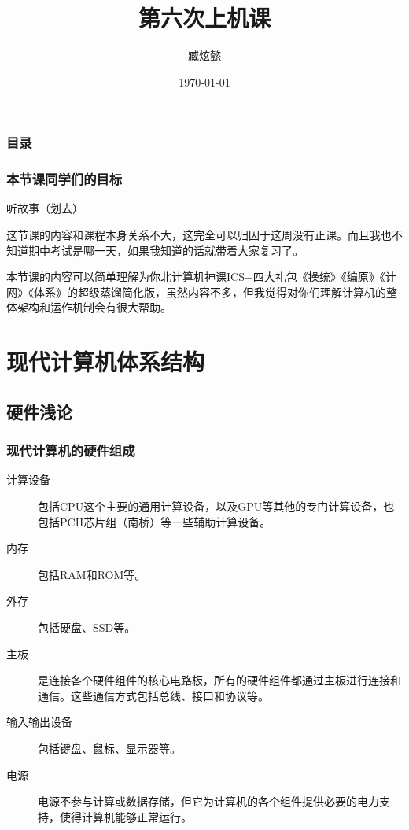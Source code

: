 \documentclass[fontset=none,aspectratio=1610]{ctexbeamer}
\title{第六次上机课}
\author{臧炫懿}
\date{\today}
\begin{document}
\frame{\titlepage}
\begin{frame}
    \frametitle{目录}
    \tableofcontents
\end{frame}

\begin{frame}
    \frametitle{本节课同学们的目标}

    听故事（划去）

    这节课的内容和课程本身关系不大，这完全可以归因于这周没有正课。而且我也不知道期中考试是哪一天，如果我知道的话就带着大家复习了。

    本节课的内容可以简单理解为你北计算机神课ICS+四大礼包《操统》《编原》《计网》《体系》的超级蒸馏简化版，虽然内容不多，但我觉得对你们理解计算机的整体架构和运作机制会有很大帮助。

\end{frame}

\section{现代计算机体系结构}
\frame{\sectionpage}
\subsection{硬件浅论}
\begin{frame}
    \frametitle{现代计算机的硬件组成}

    \begin{description}
        \item[计算设备] 包括CPU这个主要的通用计算设备，以及GPU等其他的专门计算设备，也包括PCH芯片组（南桥）等一些辅助计算设备。
        \item[内存] 包括RAM和ROM等。
        \item[外存] 包括硬盘、SSD等。
        \item[主板] 是连接各个硬件组件的核心电路板，所有的硬件组件都通过主板进行连接和通信。这些通信方式包括总线、接口和协议等。
        \item[输入输出设备] 包括键盘、鼠标、显示器等。
        \item[电源] 电源不参与计算或数据存储，但它为计算机的各个组件提供必要的电力支持，使得计算机能够正常运行。
    \end{description}

\end{frame}
\end{document}

